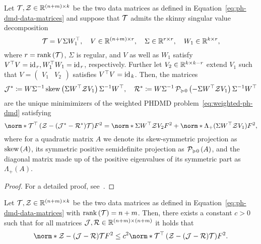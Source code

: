 \begin{lemma}\label{lem:weighted-ph-dmd-solution}
    Let $\mcl{T}, \mcl{Z} \in \bb{R}^{(n + m) \times k}$ be the two data matrices as defined in Equation~\eqref{eq:ph-dmd-data-matrices} and suppose that $\mcl{T}$ admits the skinny singular value decomposition
    \begin{equation*}
        \mcl{T} = V \Sigma W_1\trans,\quad V \in \bb{R}^{(n + m) \times r},\quad \Sigma \in \bb{R}^{r \times r},\quad W_1 \in \bb{R}^{k \times r},
    \end{equation*}
    where $r = \rank{\mcl{T}}$, $\Sigma$ is regular, and $V$ as well as $W_1$ satisfy $V\trans V = \id[r], W_1\trans W_1 = \id[r]$, respectively.
    Further let $V_2 \in \bb{R}^{k \times k - r}$ extend $V_1$ such that $V = \begin{pmatrix}
        V_1 & V_2
    \end{pmatrix}$ satisfies $V\trans V = \id[k]$.
    Then, the matrices
    \begin{equation*}
        \mcl{J}^\ast \coloneqq W \Sigma\inv \sksym{\Sigma W\trans \mcl{Z} V_1} \Sigma\inv W\trans,\quad \mcl{R}^\ast \coloneqq W \Sigma\inv \psd{- \Sigma W\trans \mcl{Z} V_1} \Sigma\inv W\trans
    \end{equation*}
    are the unique minimimizers of the weighted \ac{PHDMD} problem~\eqref{eq:weighted-ph-dmd} satisfying
    \begin{equation*}
        \norm*{\mcl{T}\trans \left( \mcl{Z} - (\mcl{J}^\ast - \mcl{R}^\ast) \mcl{T} \right)}{F}^2 = \norm*{\Sigma W\trans \mcl{Z} V_2}{F}^2 + \norm*{\Lambda_+(\Sigma W\trans \mcl{Z} V_1)}{F}^2,
    \end{equation*}
    where for a quadratic matrix $A$ we denote its skew-symmetric projection as $\sksym{A}$, its symmetric positive semidefinite projection as $\psd{A}$, and the diagonal matrix made up of the positive eigenvalues of its symmetric part as $\Lambda_+(A)$.
\end{lemma}

\begin{proof}
    For a detailed proof, see~\cite[Proof of Theorem~3.7 and Lemma~3.10]{Morandin2023}.
\end{proof}

\begin{lemma}\label{lem:relation-ph-dmd-problems}
    Let $\mcl{T}, \mcl{Z} \in \bb{R}^{(n + m) \times k}$ be the two data matrices as defined in Equation~\eqref{eq:ph-dmd-data-matrices} with $\rank{\mcl{T}} = n + m$.
    Then, there exists a constant $c > 0$ such that for all matrices $\mcl{J}, \mcl{R} \in \bb{R}^{(n + m) \times (n + m)}$ it holds that
    \begin{equation*}
        \norm*{\mcl{Z} - (\mcl{J} - \mcl{R}) \mcl{T}}{F}^2 \leq c^2 \norm*{\mcl{T}\trans \left( \mcl{Z} - (\mcl{J} - \mcl{R}) \mcl{T} \right)}{F}^2.
    \end{equation*}
\end{lemma}

